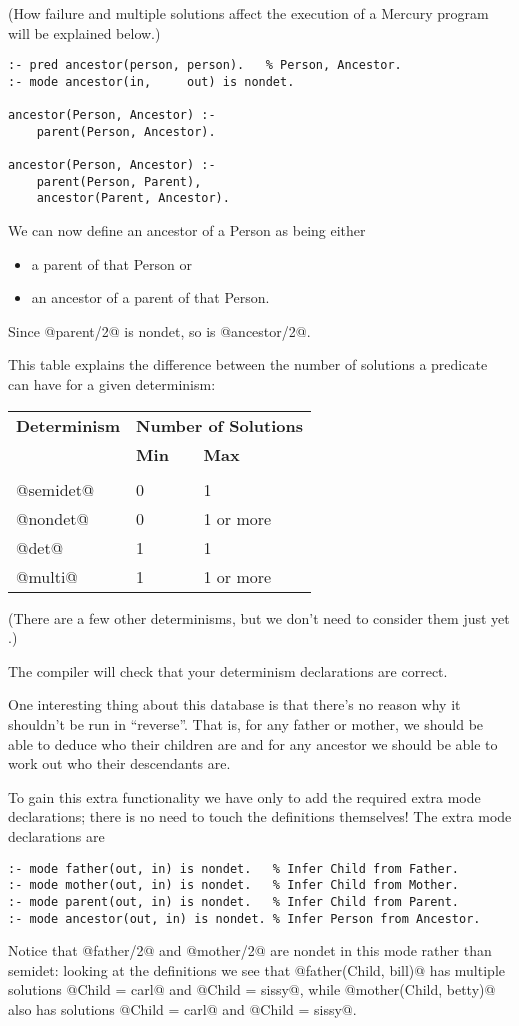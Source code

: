 (How failure and multiple solutions affect the execution of a
Mercury program will be explained below.)
\begin{verbatim}
:- pred ancestor(person, person).   % Person, Ancestor.
:- mode ancestor(in,     out) is nondet.

ancestor(Person, Ancestor) :-
    parent(Person, Ancestor).

ancestor(Person, Ancestor) :-
    parent(Person, Parent),
    ancestor(Parent, Ancestor).
\end{verbatim}
We can now define an ancestor of a Person as being either
\begin{itemize}
\item a parent of that Person or
\item an ancestor of a parent of that Person.
\end{itemize}

Since @parent/2@ is nondet, so is @ancestor/2@.

This table explains the difference between the number of
solutions a predicate can have for a given determinism:

\begin{tabular}{lll}
\textbf{Determinism}       & \multicolumn{2}{l}{\textbf{Number of Solutions}} \\
            & \textbf{Min} & \textbf{Max} \\
\hline \\
@semidet@   & 0            & 1 \\
@nondet@    & 0            & 1 or more \\
@det@       & 1            & 1 \\
@multi@     & 1            & 1 or more \\
\end{tabular}

(There are a few other determinisms, but we don't need to
consider them just yet \XXX{}.)

The compiler will check that your determinism declarations are
correct.

One interesting thing about this database is that there's no
reason why it shouldn't be run in ``reverse''.  That is, for any
father or mother, we should be able to deduce who their
children are and for any ancestor we should be able to work
out who their descendants are.

To gain this extra functionality we have only to add the
required extra mode declarations; there is no need to touch
the definitions themselves!  The extra mode declarations are
\begin{verbatim}
:- mode father(out, in) is nondet.   % Infer Child from Father.
:- mode mother(out, in) is nondet.   % Infer Child from Mother.
:- mode parent(out, in) is nondet.   % Infer Child from Parent.
:- mode ancestor(out, in) is nondet. % Infer Person from Ancestor.
\end{verbatim}
Notice that @father/2@ and @mother/2@ are nondet in this mode
rather than semidet: looking at the definitions we see that
@father(Child, bill)@ has multiple solutions @Child = carl@ and
@Child = sissy@, while @mother(Child, betty)@ also has solutions
@Child = carl@ and @Child = sissy@.

